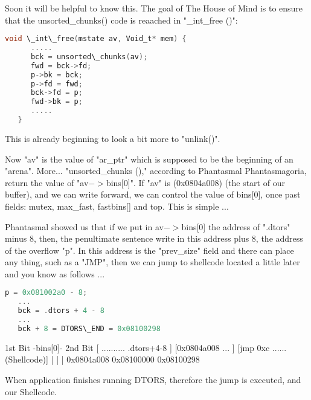 \documentclass[12pt]{article}
\begin{document}
Soon it will be helpful to know this. The goal of The House of Mind is to
ensure that the unsorted\_chunks() code is reaached in "\_int\_free ()":
\newline


\begin{lstlisting}[language=C]
   void \_int\_free(mstate av, Void_t* mem) {
      .....
      bck = unsorted\_chunks(av);
      fwd = bck->fd;
      p->bk = bck;
      p->fd = fwd;
      bck->fd = p;
      fwd->bk = p;
      .....
   }
\end{lstlisting}



This is already beginning to look a bit more to "unlink()".
\newline


Now "av" is the value of "ar\_ptr" which is supposed to be the beginning
of an "arena". More... "unsorted\_chunks ()," according to Phantasmal
Phantasmagoria, return the value of "av$->$bins[0]". If "av" is (0x0804a008)
(the start of our buffer), and we can write forward, we can control the
value of bins[0], once past fields: mutex, max\_fast, fastbins[] and top.
This is simple ...
\newline


Phantasmal showed us that if we put in av$->$bins[0] the address of ".dtors"
minus 8, then, the penultimate sentence write in this  address plus 8, the
address of the overflow "p". In this address is the "prev\_size" field and
there can place any thing, such as a "JMP", then we can jump to shellcode
located a little later and you know as follows ...
\newline


\begin{lstlisting}[language=C]
   p = 0x081002a0 - 8;
   ...
   bck = .dtors + 4 - 8
   ...
   bck + 8 = DTORS\_END = 0x08100298
\end{lstlisting}

\begin{verbnobox}[\small]
   1st Bit     -bins[0]-                     2nd Bit
   [ .......... .dtors+4-8 ] [0x0804a008 ... ] [jmp 0xc ...... (Shellcode)] 
   |                         |                 |
   0x0804a008                0x08100000        0x08100298
\end{verbnobox}




When application finishes running DTORS, therefore the jump is executed,
and our Shellcode.
\newline
\end{document}
